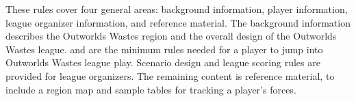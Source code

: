 These rules cover four general areas: background information, player information, league organizer information, and reference material.
The background information describes the Outworlds Wastes region and the overall design of the Outworlds Wastes league.
 and  are the minimum rules needed for a player to jump into Outworlds Wastes league play.
Scenario design and league scoring rules are provided for league organizers.
The remaining content is reference material, to include a region map and sample tables for tracking a player's forces.
